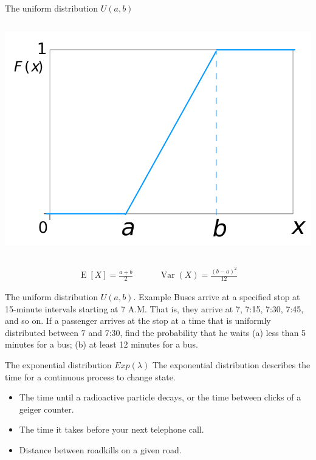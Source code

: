 \documentclass{beamer}
\newcommand{\E}{\operatorname{E}}
\newcommand{\Var}{\operatorname{Var}}
\begin{document}
\begin{frame}{The uniform distribution $U(a,b)$}
\begin{columns}
\begin{column}{0.5\textwidth}
      \includegraphics[width=\linewidth]{uniform-df}
    \end{column}
  \end{columns}
  \begin{align*}
    \E[X]=\frac{a+b}{2}\quad\quad\quad\Var(X)=\frac{{(b-a)}^2}{12}
  \end{align*}
\end{frame}

\begin{frame}[t]{The uniform distribution $U(a,b)$. Example}
  Buses arrive at a specified stop at 15-minute intervals starting at 7
  A.M. That is, they arrive at 7, 7:15, 7:30, 7:45, and so on. If a passenger
  arrives at the stop at a time that is uniformly distributed between 7 and
  7:30, find the probability that he waits (a) less than 5 minutes for a bus;
  (b) at least 12 minutes for a bus.


\end{frame}

\begin{frame}{The exponential distribution $Exp(\lambda)$}
  The exponential distribution describes the time for a continuous process to
  change state.
  \begin{itemize}
  \item The time until a radioactive particle decays, or the time between clicks
    of a geiger counter.
  \item The time it takes before your next telephone call.
  \item Distance between roadkills on a given road.
  \end{itemize}
\end{frame}
\end{document}
